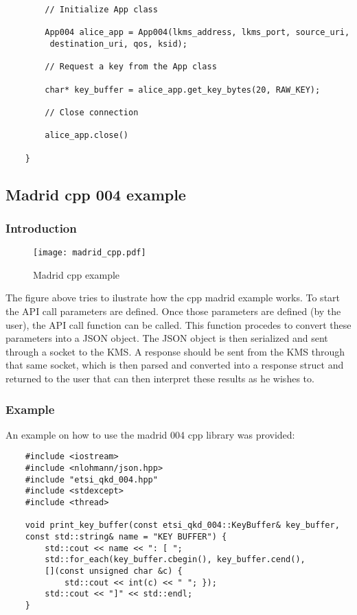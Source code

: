\begin{refsection}
\begin{itemize}
\begin{verbatim}
		// Initialize App class
		
		App004 alice_app = App004(lkms_address, lkms_port, source_uri,
		 destination_uri, qos, ksid);
		
		// Request a key from the App class
		
		char* key_buffer = alice_app.get_key_bytes(20, RAW_KEY);
		
		// Close connection
		
		alice_app.close()
		
	}		
	\end{verbatim}
	
		
\end{itemize}

\subsection{Madrid cpp 004 example}

\subsubsection{Introduction}

\begin{figure}[H]
	\centering
	\texttt{[image: madrid\_cpp.pdf]}
	\caption{Madrid cpp example}
	\label{fig:madridcpp}
\end{figure}

The figure above tries to ilustrate how the cpp madrid example works. To start the API call parameters are defined. Once those parameters are defined (by the user), the API call function can be called. This function procedes to convert these parameters into a JSON object. The JSON object is then serialized and sent through a socket to the KMS. A response should be sent from the KMS through that same socket, which is then parsed and converted into a response struct and returned to the user that can then interpret these results as he wishes to.

\subsubsection{Example}

An example on how to use the madrid 004 cpp library was provided:

\begin{verbatim}
	#include <iostream>
	#include <nlohmann/json.hpp>
	#include "etsi_qkd_004.hpp"
	#include <stdexcept>
	#include <thread>
	
	void print_key_buffer(const etsi_qkd_004::KeyBuffer& key_buffer, 
	const std::string& name = "KEY BUFFER") {
		std::cout << name << ": [ ";
		std::for_each(key_buffer.cbegin(), key_buffer.cend(), 
		[](const unsigned char &c) { 
			std::cout << int(c) << " "; });
		std::cout << "]" << std::endl;
	}
	

\end{verbatim}
\end{refsection}

